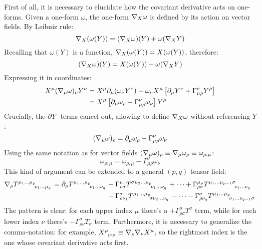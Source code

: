 First of all, it is necessary to elucidate how the covariant derivative acts on one-forms. Given a one-form $ \omega $, the one-form $ \nabla_X \omega $ is defined by its action on vector fields. By Leibniz rule:
\begin{equation*}
  \nabla_X (\omega(Y)) = (\nabla_X \omega)(Y) + \omega(\nabla_X Y)
\end{equation*}
Recalling that $ \omega(Y) $ is a function, $ \nabla_X (\omega(Y)) = X(\omega(Y)) $, therefore:
\begin{equation}
  (\nabla_X \omega)(Y) = X(\omega(Y)) - \omega(\nabla_X Y)
  \label{eq:3.27}
\end{equation}
Expressing it in coordinates:
\begin{equation*}
  \begin{split}
    X^\mu (\nabla_\mu \omega)_\nu Y^\nu
    &= X^\mu \partial_\mu (\omega_\nu Y^\nu) - \omega_\nu X^\mu \left[ \partial_\mu Y^\nu + \Gamma^\nu_{\mu \rho} Y^\rho \right] \\
    &= X^\mu \left[ \partial_\mu \omega_\rho - \Gamma^\nu_{\mu \rho} \omega_{\nu} \right] Y^\rho
  \end{split}
\end{equation*}
Crucially, the $ \partial Y $ terms cancel out, allowing to define $ \nabla_X \omega $ without referencing $ Y $:
\begin{equation}
  (\nabla_\mu \omega)_\rho = \partial_\mu \omega_\rho - \Gamma^\nu_{\mu \rho} \omega_\nu
  \label{eq:3.28}
\end{equation}
Using the same notation as for vector fields $ (\nabla_\mu \omega)_\rho \equiv \nabla_\mu \omega_\rho \equiv \omega_{\rho ; \mu} $:
\begin{equation}
  \omega_{\rho ;\mu} = \omega_{\rho,\mu} - \Gamma^\nu_{\mu \rho} \omega_\nu
  \label{eq:3.29}
\end{equation}
This kind of argument can be extended to a general $ (p,q) $ tensor field:
\begin{equation}
  \begin{split}
    \na_\rho \tensor{T}{^{\mu_1} ^\dots ^{\mu_p} _{\nu_1} _\dots _{\mu_q}} = \pa_\rho \tensor{T}{^{\mu_1} ^\dots ^{\mu_p} _{\nu_1} _\dots _{\nu_q}}
    &+ \Gamma^{\mu_1}_{\rho \sigma} \tensor{T}{^\sigma ^{\mu_2} ^\dots ^{\mu_p} _{\nu_1} _\dots _{\nu_q}} + \dots + \Gamma^{\mu_p}_{\rho \sigma} \tensor{T}{^{\mu_1} ^\dots ^{\mu_{p-1}} ^\sigma _{\nu_1} _\dots _{\nu_q}} \\
    &- \Gamma^\sigma_{\rho \nu_1} \tensor{T}{^{\mu_1} ^\dots ^{\mu_p} _\sigma _{\nu_2} _\dots _{\nu_q}} - \dots - \Gamma^\sigma_{\rho \nu_q} \tensor{T}{^{\mu_1} ^\dots ^{\mu_p} _{\nu_1} _\dots _{\nu_{q-1}} _\sigma}
  \end{split}
  \label{eq:3.30}
\end{equation}
The pattern is clear: for each upper index $ \mu $ there's a $ + \Gamma^\mu_{\rho \sigma} T^\sigma $ term, while for each lower index $ \nu $ there's $ - \Gamma^\sigma_{\rho \nu} T_\sigma $ term. Furthermore, it is necessary to generalize the comma-notation: for example, $ \tensor{X}{^\mu _; _\nu _\rho} \equiv \na_\rho \na_\nu X^\mu $, so the rightmost index is the one whose covariant derivative acts first.

